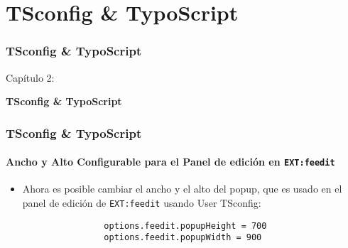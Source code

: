 %

\section{TSconfig \& TypoScript}
\begin{frame}[fragile]
	\frametitle{TSconfig \& TypoScript}

	\begin{center}\huge{Capítulo 2:}\end{center}
	\begin{center}\huge{\color{typo3darkgrey}\textbf{TSconfig \& TypoScript}}\end{center}

\end{frame}


\begin{frame}[fragile]
	\frametitle{TSconfig \& TypoScript}
	\framesubtitle{Ancho y Alto Configurable para el Panel de edición en
	\texttt{EXT:feedit}}

	\lstset{basicstyle=\small\ttfamily}

	\begin{itemize}

		\item Ahora es posible cambiar el ancho y el alto del popup, que es usado en el
			panel de edición de \texttt{EXT:feedit} usando User TSconfig:
			\begin{lstlisting}
				options.feedit.popupHeight = 700
				options.feedit.popupWidth = 900
			\end{lstlisting}

	\end{itemize}

\end{frame}

